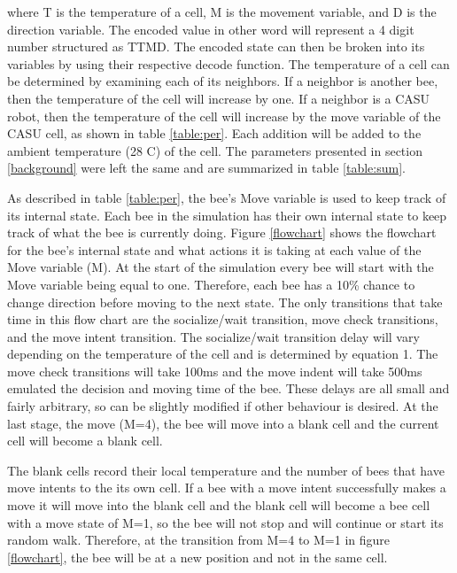 \documentclass[conference,compsoc,onecolumn]{IEEEtran}
\begin{document}
where T is the temperature of a cell, M is the movement variable, and D is the direction variable. The encoded value in other word will represent a 4 digit number structured as TTMD. The encoded state can then be broken into its variables by using their respective decode function. The temperature of a cell can be determined by examining each of its neighbors. If a neighbor is another bee, then the temperature of the cell will increase by one. If a neighbor is a CASU robot, then the temperature of the cell will increase by the move variable of the CASU cell, as shown in table \ref{table:per}. Each addition will be added to the ambient temperature (28 \degree C) of the cell.
The parameters presented in section \ref{background} were left the same and are summarized in table \ref{table:sum}.

As described in table \ref{table:per}, the bee's Move variable is used to keep track of its internal state. Each bee in the simulation has their own internal state to keep track of what the bee is currently doing. Figure \ref{flowchart} shows the flowchart for the bee's internal state and what actions it is taking at each value of the Move variable (M). At the start of the simulation every bee will start with the Move variable being equal to one. Therefore, each bee has a 10\% chance to change direction before moving to the next state. The only transitions that take time in this flow chart are the socialize/wait transition, move check transitions, and the move intent transition. The socialize/wait transition delay will vary depending on the temperature of the cell and is determined by equation 1. The move check transitions will take 100ms and the move indent will take 500ms emulated the decision and moving time of the bee. These delays are all small and fairly arbitrary, so can be slightly modified if other behaviour is desired. At the last stage, the move (M=4), the bee will move into a blank cell and the current cell will become a blank cell.

The blank cells record their local temperature and the number of bees that have move intents to the its own cell. If a bee with a move intent successfully makes a move it will move into the blank cell and the blank cell will become a bee cell with a move state of M=1, so the bee will not stop and will continue or start its random walk. Therefore, at the transition from M=4 to M=1 in figure \ref{flowchart}, the bee will be at a new position and not in the same cell.
\end{document}
